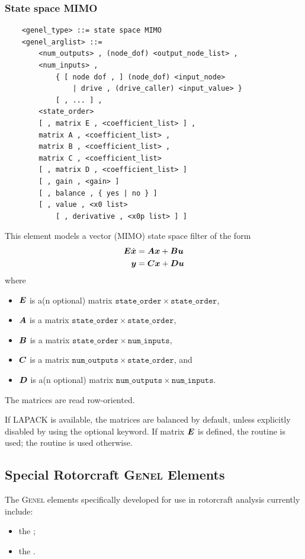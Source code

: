 \subsubsection{State space MIMO}
\label{sec:EL:GENEL:STATE-SPACE-MIMO}
\begin{verbatim}
    <genel_type> ::= state space MIMO
    <genel_arglist> ::=
        <num_outputs> , (node_dof) <output_node_list> ,
        <num_inputs> ,
            { [ node dof , ] (node_dof) <input_node>
                | drive , (drive_caller) <input_value> }
            [ , ... ] ,
        <state_order>
        [ , matrix E , <coefficient_list> ] ,
        matrix A , <coefficient_list> ,
        matrix B , <coefficient_list> ,
        matrix C , <coefficient_list>
        [ , matrix D , <coefficient_list> ]
        [ , gain , <gain> ]
        [ , balance , { yes | no } ]
        [ , value , <x0 list>
            [ , derivative , <x0p list> ] ]
\end{verbatim}
This element models a vector (MIMO) state space filter of the form
\begin{align*}
        \boldsymbol{E} \dot{\boldsymbol{x}} &= \boldsymbol{A}\boldsymbol{x}+\boldsymbol{B}\boldsymbol{u} \\
	\boldsymbol{y} &= \boldsymbol{C}\boldsymbol{x}+\boldsymbol{D}\boldsymbol{u}
\end{align*}
where
\begin{itemize}
\item $\boldsymbol{E}$ is a(n optional) matrix
	$\mathtt{state\_order} \times \mathtt{state\_order}$,
\item $\boldsymbol{A}$ is a matrix
	$\mathtt{state\_order} \times \mathtt{state\_order}$,
\item $\boldsymbol{B}$ is a matrix
	$\mathtt{state\_order} \times \mathtt{num\_inputs}$,
\item $\boldsymbol{C}$ is a matrix
	$\mathtt{num\_outputs} \times \mathtt{state\_order}$, and
\item $\boldsymbol{D}$ is a(n optional) matrix
	$\mathtt{num\_outputs} \times \mathtt{num\_inputs}$.
\end{itemize}
The matrices are read row-oriented.

If LAPACK is available, the matrices are balanced by default,
unless explicitly disabled by using the  optional keyword.
If matrix $\boldsymbol{E}$ is defined, the  routine is used;
the  routine is used otherwise.


\subsection{Special Rotorcraft \textsc{Genel} Elements}
The \textsc{Genel} elements specifically developed for use
in rotorcraft analysis currently include:
\begin{itemize}
\item the ;
\item the .
\end{itemize}

